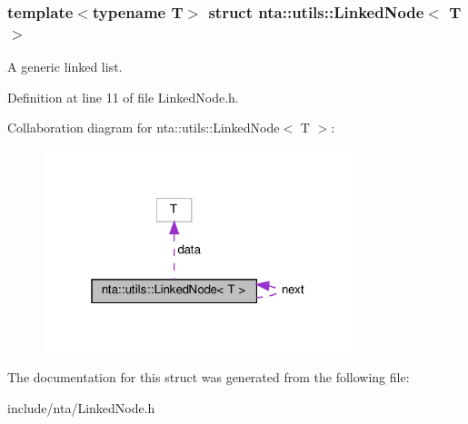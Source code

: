 \subsubsection*{template$<$typename T$>$\newline
struct nta\+::utils\+::\+Linked\+Node$<$ T $>$}

A generic linked list. 

Definition at line 11 of file Linked\+Node.\+h.



Collaboration diagram for nta\+:\+:utils\+:\+:Linked\+Node$<$ T $>$\+:\nopagebreak
\begin{figure}[H]
\begin{center}
\leavevmode
\includegraphics[width=256pt]{d8/d8c/structnta_1_1utils_1_1LinkedNode__coll__graph}
\end{center}
\end{figure}


The documentation for this struct was generated from the following file\+:\begin{DoxyCompactItemize}
\item 
include/nta/Linked\+Node.\+h\end{DoxyCompactItemize}
